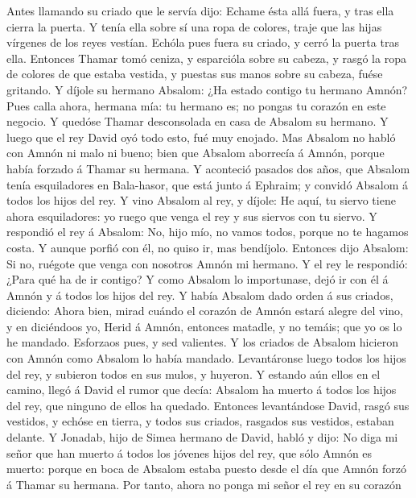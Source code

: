 Antes llamando su criado que le servía dijo: Echame ésta allá fuera, y
tras ella cierra la puerta.  Y tenía ella sobre sí una ropa
de colores, traje que las hijas vírgenes de los reyes vestían. Echóla
pues fuera su criado, y cerró la puerta tras ella. 
Entonces Thamar tomó ceniza, y esparcióla sobre su cabeza, y rasgó la
ropa de colores de que estaba vestida, y puestas sus manos sobre su
cabeza, fuése gritando.  Y díjole su hermano Absalom: ¿Ha
estado contigo tu hermano Amnón? Pues calla ahora, hermana mía: tu
hermano es; no pongas tu corazón en este negocio. Y quedóse Thamar
desconsolada en casa de Absalom su hermano.  Y luego que el
rey David oyó todo esto, fué muy enojado.  Mas Absalom no
habló con Amnón ni malo ni bueno; bien que Absalom aborrecía á Amnón,
porque había forzado á Thamar su hermana.  Y aconteció
pasados dos años, que Absalom tenía esquiladores en Bala-hasor, que está
junto á Ephraim; y convidó Absalom á todos los hijos del rey.
 Y vino Absalom al rey, y díjole: He aquí, tu siervo tiene
ahora esquiladores: yo ruego que venga el rey y sus siervos con tu
siervo.  Y respondió el rey á Absalom: No, hijo mío, no
vamos todos, porque no te hagamos costa. Y aunque porfió con él, no
quiso ir, mas bendíjolo.  Entonces dijo Absalom: Si no,
ruégote que venga con nosotros Amnón mi hermano. Y el rey le respondió:
¿Para qué ha de ir contigo?  Y como Absalom lo importunase,
dejó ir con él á Amnón y á todos los hijos del rey.  Y
había Absalom dado orden á sus criados, diciendo: Ahora bien, mirad
cuándo el corazón de Amnón estará alegre del vino, y en diciéndoos yo,
Herid á Amnón, entonces matadle, y no temáis; que yo os lo he mandado.
Esforzaos pues, y sed valientes.  Y los criados de Absalom
hicieron con Amnón como Absalom lo había mandado. Levantáronse luego
todos los hijos del rey, y subieron todos en sus mulos, y huyeron.
 Y estando aún ellos en el camino, llegó á David el rumor
que decía: Absalom ha muerto á todos los hijos del rey, que ninguno de
ellos ha quedado.  Entonces levantándose David, rasgó sus
vestidos, y echóse en tierra, y todos sus criados, rasgados sus
vestidos, estaban delante.  Y Jonadab, hijo de Simea
hermano de David, habló y dijo: No diga mi señor que han muerto á todos
los jóvenes hijos del rey, que sólo Amnón es muerto: porque en boca de
Absalom estaba puesto desde el día que Amnón forzó á Thamar su hermana.
 Por tanto, ahora no ponga mi señor el rey en su corazón
